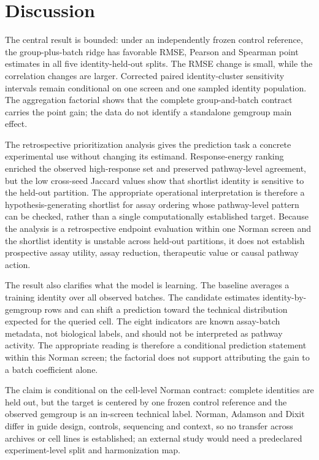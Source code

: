 \documentclass[10pt]{article}
\begin{document}
\section{Discussion}
The central result is bounded: under an independently frozen control reference, the group-plus-batch ridge has favorable RMSE, Pearson and Spearman point estimates in all five identity-held-out splits. The RMSE change is small, while the correlation changes are larger. Corrected paired identity-cluster sensitivity intervals remain conditional on one screen and one sampled identity population. The aggregation factorial shows that the complete group-and-batch contract carries the point gain; the data do not identify a standalone gemgroup main effect.

The retrospective prioritization analysis gives the prediction task a concrete experimental use without changing its estimand. Response-energy ranking enriched the observed high-response set and preserved pathway-level agreement, but the low cross-seed Jaccard values show that shortlist identity is sensitive to the held-out partition. The appropriate operational interpretation is therefore a hypothesis-generating shortlist for assay ordering whose pathway-level pattern can be checked, rather than a single computationally established target. Because the analysis is a retrospective endpoint evaluation within one Norman screen and the shortlist identity is unstable across held-out partitions, it does not establish prospective assay utility, assay reduction, therapeutic value or causal pathway action.

The result also clarifies what the model is learning. The baseline averages a training identity over all observed batches. The candidate estimates identity-by-gemgroup rows and can shift a prediction toward the technical distribution expected for the queried cell. The eight indicators are known assay-batch metadata, not biological labels, and should not be interpreted as pathway activity. The appropriate reading is therefore a conditional prediction statement within this Norman screen; the factorial does not support attributing the gain to a batch coefficient alone.

The claim is conditional on the cell-level Norman contract: complete identities are held out, but the target is centered by one frozen control reference and the observed gemgroup is an in-screen technical label. Norman, Adamson and Dixit differ in guide design, controls, sequencing and context, so no transfer across archives or cell lines is established; an external study would need a predeclared experiment-level split and harmonization map.
\end{document}

